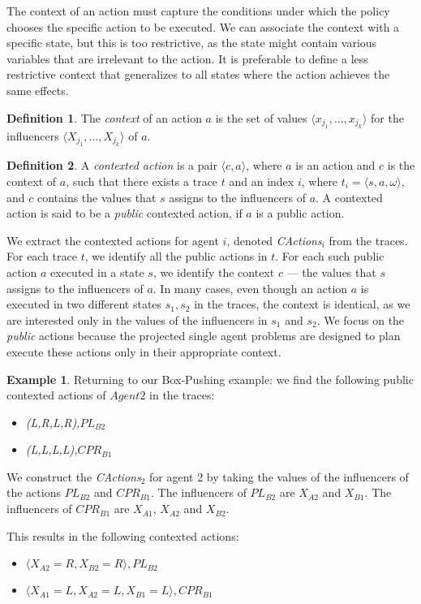\documentclass[letterpaper]{article} %
\theoremstyle{definition}
\newtheorem{definition}{Definition}
\newtheorem{example}{Example}
\newcommand{\cact}[1]{{\em CActions$_#1$}}
\begin{document}
The context of an action must capture the conditions under which the policy chooses the specific action to be executed. We can associate the context with a specific state, but this is too restrictive, as the state might contain various variables that are irrelevant to the action. It is preferable to define a less restrictive context that generalizes to all states where the action achieves the same effects. 


\begin{definition}
The {\em context} of an action $a$ is the set of values $\langle x_{j_1},...,x_{j_k} \rangle$ for the influencers $\langle X_{j_1},...,X_{j_k} \rangle$ of $a$.
\end{definition}

\begin{definition}
A {\em contexted action} is a pair $\langle c,a \rangle$, where $a$ is an action and $c$ is the context of $a$, such that there exists a trace $t$ and an index $i$, where $t_i=\langle s,a,\omega \rangle$, and $c$ contains the values that $s$ assigns to the influencers of $a$. A contexted action is said to be a \emph{public} contexted action, if $a$ is a public action.
\end{definition}

We extract the contexted actions for agent $i$, denoted  \cact{i} from the traces.
For each trace $t$, we identify all the public actions in $t$. For each such public action $a$ executed in a state $s$, we identify the context $c$ --- the values that $s$ assigns to the influencers of $a$. In many cases, even though an action $a$ is executed in two different states $s_1,s_2$ in the traces, the context is identical, as we are interested only in the values of the influencers in $s_1$ and $s_2$.
We focus on the \emph{public} actions because the projected single agent problems are designed to plan execute these actions only in their appropriate context.


\begin{example}
Returning to our Box-Pushing example: we find the following public contexted actions of $Agent2$ in the traces:
\begin{itemize}
    \item \emph{(L,R,L,R),$PL_{B2}$}
    \item \emph{(L,L,L,L),$CPR_{B1}$}
\end{itemize}


We construct the \cact{2} for agent 2 by taking the values of the influencers of the actions $PL_{B2}$ and $CPR_{B1}$. The influencers of $PL_{B2}$ are $X_{A2}$ and $X_{B1}$. The influencers of $CPR_{B1}$ are  $X_{A1}$, $X_{A2}$ and $X_{B2}$. 

This results in the following contexted actions:
\begin{itemize}
    \item $\langle X_{A2}=R, X_{B2}=R\rangle ,PL_{B2}$
    \item $\langle X_{A1}=L, X_{A2}=L, X_{B1}=L\rangle ,CPR_{B1}$
\end{itemize}
\end{example}
\end{document}
